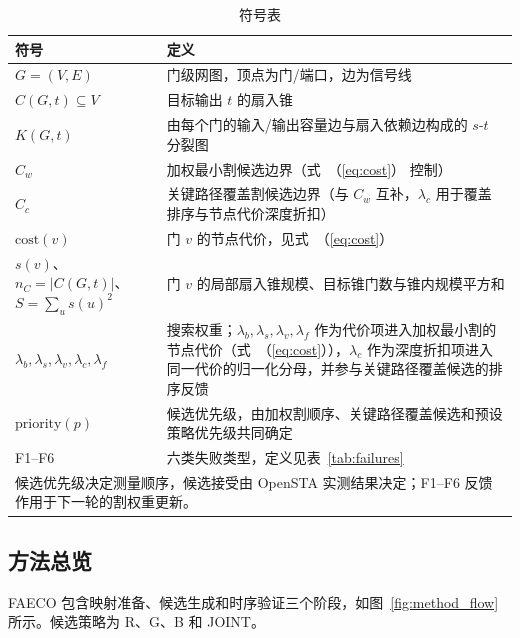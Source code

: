 \documentclass[twocolumn,10pt,fontset=windows]{ctexart}
\renewcommand{\eqref}[1]{\textup{（\ref{#1}）}}
\begin{document}
\begin{table}[ht]
\centering
\caption{符号表}
\label{tab:symbols}
\scriptsize
\setlength{\tabcolsep}{2pt}
\renewcommand{\arraystretch}{0.9}
\begin{tabular}{p{2.6cm}p{4.9cm}}
\toprule
\textbf{符号} & \textbf{定义} \\
\midrule
$G = (V, E)$ & 门级网图，顶点为门/端口，边为信号线 \\
$C(G, t) \subseteq V$ & 目标输出 $t$ 的扇入锥 \\
$K(G, t)$ & 由每个门的输入/输出容量边与扇入依赖边构成的 $s$-$t$ 分裂图 \\
$C_w$ & 加权最小割候选边界（式~\eqref{eq:cost} 控制） \\
$C_c$ & 关键路径覆盖割候选边界（与 $C_w$ 互补，$\lambda_c$ 用于覆盖排序与节点代价深度折扣） \\
$\mathrm{cost}(v)$ & 门 $v$ 的节点代价，见式~\eqref{eq:cost} \\
$s(v)$、$n_C=|C(G,t)|$、$S=\sum_u s(u)^2$ & 门 $v$ 的局部扇入锥规模、目标锥门数与锥内规模平方和 \\
$\lambda_b,\lambda_s,\lambda_v,\lambda_c,\lambda_f$ & 搜索权重；$\lambda_b,\lambda_s,\lambda_v,\lambda_f$ 作为代价项进入加权最小割的节点代价（式~\eqref{eq:cost}），$\lambda_c$ 作为深度折扣项进入同一代价的归一化分母，并参与关键路径覆盖候选的排序反馈 \\
$\mathrm{priority}(p)$ & 候选优先级，由加权割顺序、关键路径覆盖候选和预设策略优先级共同确定 \\
F1--F6 & 六类失败类型，定义见表~\ref{tab:failures} \\
\bottomrule
\multicolumn{2}{p{7.3cm}}{\footnotesize 候选优先级决定测量顺序，候选接受由 OpenSTA 实测结果决定；F1--F6 反馈作用于下一轮的割权重更新。}\\
\end{tabular}
\end{table}

\subsection{方法总览}\label{sec:overview}

FAECO 包含映射准备、候选生成和时序验证三个阶段，如图~\ref{fig:method_flow} 所示。候选策略为 R、G、B 和 JOINT。
\end{document}
